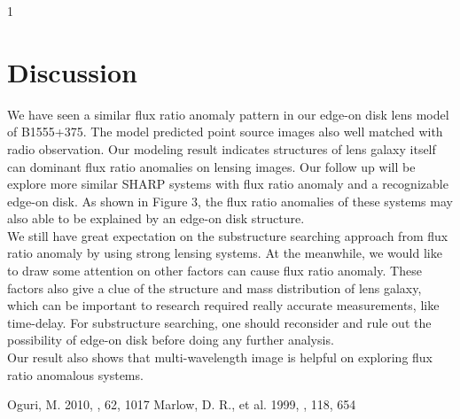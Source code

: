 1\documentclass[manuscript]{emulateapj}
\begin{document}
\section{Discussion}
We have seen a similar flux ratio anomaly pattern in our edge-on disk lens model of B1555+375. The model predicted point source images also well matched with radio observation. Our modeling result indicates structures of lens galaxy itself can dominant flux ratio anomalies on lensing images. 
Our follow up will be explore more similar SHARP systems with flux ratio anomaly and a recognizable edge-on disk. As shown in Figure 3, the flux ratio anomalies of these systems may also able to be explained by an edge-on disk structure.\\
We still have great expectation on the substructure searching approach from flux ratio anomaly by using strong lensing systems. At the meanwhile, we would like to draw some attention on other factors can cause flux ratio anomaly. These factors also give a clue of the structure and mass distribution of lens galaxy, which can be important to research required really accurate measurements, like time-delay.  For substructure searching, one should reconsider and rule out the possibility of edge-on disk before doing any further analysis.\\
Our result also shows that multi-wavelength image is helpful on exploring flux ratio anomalous systems.

\begin{thebibliography}{}
 Oguri, M. 2010, \pasj, 62, 1017
 Marlow, D. R., et al. 1999, \apj, 118, 654
\end{thebibliography}
\end{document}
